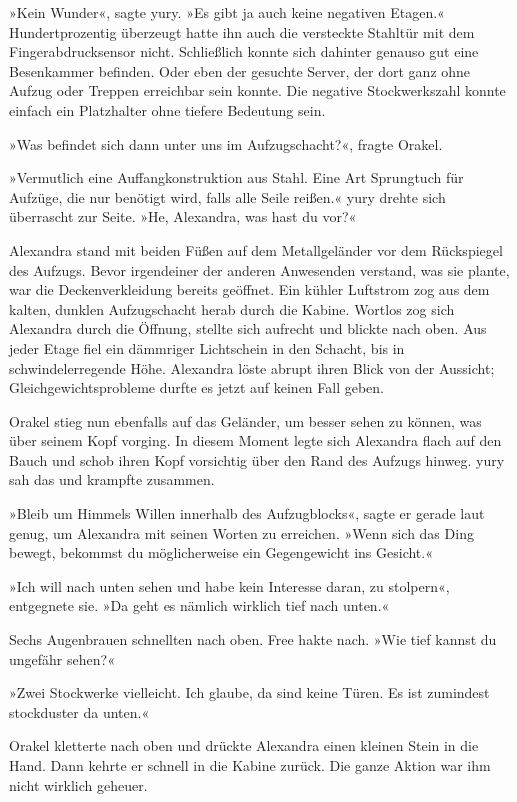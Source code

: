 »Kein Wunder«, sagte yury. »Es gibt ja auch keine negativen Etagen.« Hundertprozentig überzeugt hatte ihn auch die versteckte Stahltür mit dem Fingerabdrucksensor nicht. Schließlich konnte sich dahinter genauso gut eine Besenkammer befinden. Oder eben der gesuchte Server, der dort ganz ohne Aufzug oder Treppen erreichbar sein konnte. Die negative Stockwerkszahl konnte einfach ein Platzhalter ohne tiefere Bedeutung sein.

»Was befindet sich dann unter uns im Aufzugschacht?«, fragte Orakel.

»Vermutlich eine Auffangkonstruktion aus Stahl. Eine Art Sprungtuch für Aufzüge, die nur benötigt wird, falls alle Seile reißen.« yury drehte sich überrascht zur Seite. »He, Alexandra, was hast du vor?«

Alexandra stand mit beiden Füßen auf dem Metallgeländer vor dem Rückspiegel des Aufzugs. Bevor irgendeiner der anderen Anwesenden verstand, was sie plante, war die Deckenverkleidung bereits geöffnet. Ein kühler Luftstrom zog aus dem kalten, dunklen Aufzugschacht herab durch die Kabine. Wortlos zog sich Alexandra durch die Öffnung, stellte sich aufrecht und blickte nach oben. Aus jeder Etage fiel ein dämmriger Lichtschein in den Schacht, bis in schwindelerregende Höhe. Alexandra löste abrupt ihren Blick von der Aussicht; Gleichgewichtsprobleme durfte es jetzt auf keinen Fall geben.

Orakel stieg nun ebenfalls auf das Geländer, um besser sehen zu können, was über seinem Kopf vorging. In diesem Moment legte sich Alexandra flach auf den Bauch und schob ihren Kopf vorsichtig über den Rand des Aufzugs hinweg. yury sah das und krampfte zusammen.

»Bleib um Himmels Willen innerhalb des Aufzugblocks«, sagte er gerade laut genug, um Alexandra mit seinen Worten zu erreichen. »Wenn sich das Ding bewegt, bekommst du möglicherweise ein Gegengewicht ins Gesicht.«

»Ich will nach unten sehen und habe kein Interesse daran, zu stolpern«, entgegnete sie. »Da geht es nämlich wirklich tief nach unten.«

Sechs Augenbrauen schnellten nach oben. Free hakte nach. »Wie tief kannst du ungefähr sehen?«

»Zwei Stockwerke vielleicht. Ich glaube, da sind keine Türen. Es ist zumindest stockduster da unten.«

Orakel kletterte nach oben und drückte Alexandra einen kleinen Stein in die Hand. Dann kehrte er schnell in die Kabine zurück. Die ganze Aktion war ihm nicht wirklich geheuer.

